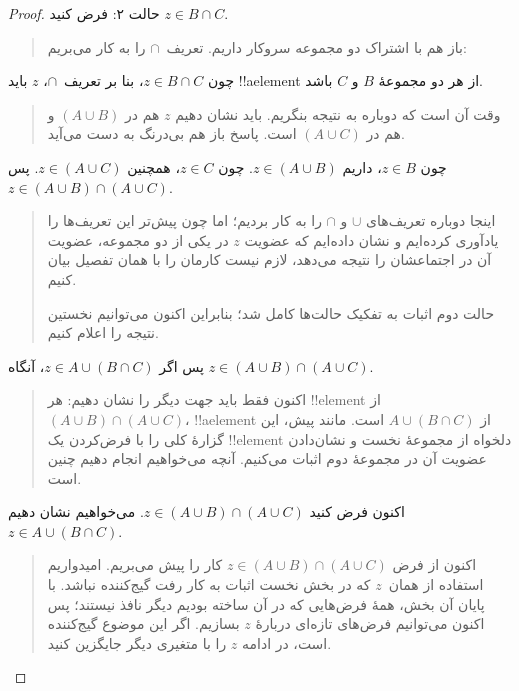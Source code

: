\documentclass[../../../include/open-logic-section]{subfiles}
\begin{document}
\begin{proof}
حالت ۲: فرض کنید $z \in B \cap C$.
\begin{quote}
باز هم با اشتراک دو مجموعه سروکار داریم. تعریف~$\cap$ را به کار می‌بریم:
\end{quote}
چون $z \in B \cap C$، بنا بر تعریف~$\cap$، $z$ باید !!a{element} از هر
دو مجموعهٔ $B$ و $C$ باشد.
\begin{quote}
وقت آن است که دوباره به نتیجه بنگریم. باید نشان دهیم $z$ هم در
$(A \cup B)$ و هم در $(A \cup C)$ است. پاسخ باز هم بی‌درنگ به دست می‌آید.
\end{quote}
چون $z \in B$، داریم $z \in (A \cup B)$. چون $z \in C$، همچنین
$z \in (A \cup C)$. پس $z \in (A \cup B) \cap (A \cup C)$.
\begin{quote}
اینجا دوباره تعریف‌های $\cup$ و $\cap$ را به کار بردیم؛ اما چون پیش‌تر
این تعریف‌ها را یادآوری کرده‌ایم و نشان داده‌ایم که عضویت $z$ در یکی
از دو مجموعه، عضویت آن در اجتماعشان را نتیجه می‌دهد، لازم نیست کارمان
را با همان تفصیل بیان کنیم.

حالت دوم اثبات به تفکیک حالت‌ها کامل شد؛ بنابراین اکنون می‌توانیم
نخستین نتیجه را اعلام کنیم.
\end{quote}
پس اگر $z \in A \cup (B \cap C)$، آنگاه
$z \in (A \cup B) \cap (A \cup C)$.
\begin{quote}
اکنون فقط باید جهت دیگر را نشان دهیم: هر !!{element} از
$(A \cup B) \cap (A \cup C)$، !!a{element} از $A \cup (B \cap C)$ است.
مانند پیش، این گزارهٔ کلی را با فرض‌کردن یک !!{element} دلخواه از
مجموعهٔ نخست و نشان‌دادن عضویت آن در مجموعهٔ دوم اثبات می‌کنیم. آنچه
می‌خواهیم انجام دهیم چنین است.
\end{quote}
اکنون فرض کنید $z \in (A \cup B) \cap (A \cup C)$. می‌خواهیم نشان دهیم
$z \in A \cup (B \cap C)$.
\begin{quote}
اکنون از فرض $z \in (A \cup B) \cap (A \cup C)$ کار را پیش می‌بریم.
امیدواریم استفاده از همان~$z$ که در بخش نخست اثبات به کار رفت گیج‌کننده
نباشد. با پایان آن بخش، همهٔ فرض‌هایی که در آن ساخته بودیم دیگر نافذ
نیستند؛ پس اکنون می‌توانیم فرض‌های تازه‌ای دربارهٔ $z$ بسازیم. اگر این
موضوع گیج‌کننده است، در ادامه $z$ را با متغیری دیگر جایگزین کنید.


\end{quote}
\end{proof}
\end{document}
